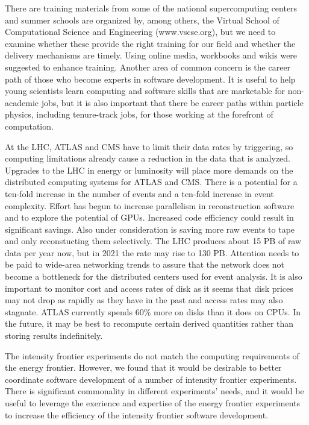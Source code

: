 There are training materials from some of the national
supercomputing centers and summer schools are organized
by, among others, the Virtual School of Computational
Science and Engineering (www.vscse.org), but we need to examine whether these
provide the right training for our field and whether the
delivery mechanisms are timely.  Using online media, workbooks
and wikis were suggested to enhance training.  Another area of
common concern is the career path of those who become experts in
software development.  It is useful to help young scientists learn
computing and software skills that are marketable for non-academic
jobs, but it is also important that there be career paths within particle
physics, including tenure-track jobs, for those working at the
forefront of computation.

At the LHC, ATLAS and CMS have to limit their data rates by
triggering, so computing limitations already cause a reduction in
the data that is analyzed.
Upgrades to the LHC in energy or luminosity will place more 
demands on the distributed computing systems for ATLAS and CMS.  
There is a potential for a ten-fold increase in the number of events
and a ten-fold increase in event complexity.  Effort has begun to 
increase parallelism in reconstruction software and to explore
the potential of GPUs.  Increased code efficiency could result in
significant savings.  Also under consideration is saving 
more raw events to tape and only reconstucting them selectively.
The LHC produces about 15 PB of raw data per year now, but in 2021
the rate may rise to 130 PB.  Attention needs to be paid
to wide-area networking trends to assure that the network does not
become a bottleneck for the distributed centers used for event analysis.
It is also important to monitor cost and access rates of disk as
it seems that disk prices may not drop as rapidly as they have in the
past and access rates may also stagnate.  ATLAS currently spends
60\% more on disks than it does on CPUs.  In the future, it may be
best to recompute certain derived quantities rather than storing
results indefinitely.

The intensity frontier experiments do not match the computing requirements
of the energy frontier.  However, we found that
it would be desirable to better coordinate software development of
a number of intensity frontier experiments.  There is significant commonality
in different experiments' needs, and it would be useful to leverage
the exerience and expertise of the energy frontier experiments
to increase the efficiency of the intensity frontier software development.

